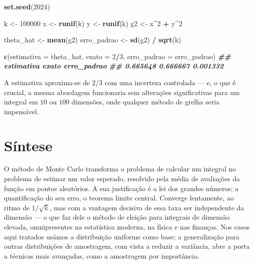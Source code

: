 \documentclass[
  portuguese,
  11pt,
  openany]{book}
\newenvironment{Shaded}{\begin{snugshade}}{\end{snugshade}}
\newcommand{\AttributeTok}[1]{\textcolor[rgb]{0.13,0.29,0.53}{#1}}
\newcommand{\DecValTok}[1]{\textcolor[rgb]{0.00,0.00,0.81}{#1}}
\newcommand{\DocumentationTok}[1]{\textcolor[rgb]{0.56,0.35,0.01}{\textbf{\textit{#1}}}}
\newcommand{\FunctionTok}[1]{\textcolor[rgb]{0.13,0.29,0.53}{\textbf{#1}}}
\newcommand{\NormalTok}[1]{#1}
\newcommand{\OtherTok}[1]{\textcolor[rgb]{0.56,0.35,0.01}{#1}}
\newcommand{\SpecialCharTok}[1]{\textcolor[rgb]{0.81,0.36,0.00}{\textbf{#1}}}
\begin{document}
\begin{Shaded}
\begin{Highlighting}[]
\FunctionTok{set.seed}\NormalTok{(}\DecValTok{2024}\NormalTok{)}

\NormalTok{k }\OtherTok{\textless{}{-}} \DecValTok{100000}
\NormalTok{x }\OtherTok{\textless{}{-}} \FunctionTok{runif}\NormalTok{(k)}
\NormalTok{y }\OtherTok{\textless{}{-}} \FunctionTok{runif}\NormalTok{(k)}
\NormalTok{g2 }\OtherTok{\textless{}{-}}\NormalTok{ x}\SpecialCharTok{\^{}}\DecValTok{2} \SpecialCharTok{+}\NormalTok{ y}\SpecialCharTok{\^{}}\DecValTok{2}

\NormalTok{theta\_hat }\OtherTok{\textless{}{-}} \FunctionTok{mean}\NormalTok{(g2)}
\NormalTok{erro\_padrao }\OtherTok{\textless{}{-}} \FunctionTok{sd}\NormalTok{(g2) }\SpecialCharTok{/} \FunctionTok{sqrt}\NormalTok{(k)}

\FunctionTok{c}\NormalTok{(}\AttributeTok{estimativa =}\NormalTok{ theta\_hat, }\AttributeTok{exato =} \DecValTok{2}\SpecialCharTok{/}\DecValTok{3}\NormalTok{, }\AttributeTok{erro\_padrao =}\NormalTok{ erro\_padrao)}
\DocumentationTok{\#\#  estimativa       exato erro\_padrao }
\DocumentationTok{\#\#    0.665648    0.666667    0.001332}
\end{Highlighting}
\end{Shaded}

A estimativa aproxima-se de \(2/3\) com uma incerteza controlada --- e, o que é
crucial, a mesma abordagem funcionaria sem alterações significativas para um
integral em \(10\) ou \(100\) dimensões, onde qualquer método de grelha seria
impensável.

\section{Síntese}\label{suxedntese-2}

O método de Monte Carlo transforma o problema de calcular um integral no
problema de estimar um valor esperado, resolvido pela média de avaliações da
função em pontos aleatórios. A sua justificação é a lei dos grandes números; a
quantificação do seu erro, o teorema limite central. Converge lentamente, ao
ritmo de \(1/\sqrt{k}\), mas com a vantagem decisiva de essa taxa ser independente
da dimensão --- o que faz dele o método de eleição para integrais de dimensão
elevada, omnipresentes na estatística moderna, na física e nas finanças. Nos
casos aqui tratados usámos a distribuição uniforme como base; a generalização
para outras distribuições de amostragem, com vista a reduzir a variância, abre a
porta a técnicas mais avançadas, como a amostragem por importância.
\end{document}
